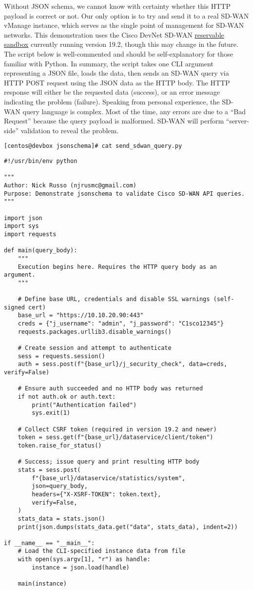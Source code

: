 Without JSON schema, we cannot know with certainty whether this HTTP payload
is correct or not. Our only option is to try and send it to a real SD-WAN
vManage instance, which serves as the single point of management for
SD-WAN networks. This demonstration uses the Cisco DevNet SD-WAN
\href{https://devnetsandbox.cisco.com/}{reservable sandbox}
currently running version 19.2, though this may
change in the future. The script below is well-commented and should
be self-explanatory for those familiar with Python. In summary,
the script takes one CLI argument representing a JSON file, loads
the data, then sends an SD-WAN query via HTTP POST request using
the JSON data as the HTTP body. The HTTP response will either be
the requested data (success), or an error message indicating the
problem (failure). Speaking from personal experience, the SD-WAN
query language is complex. Most of the time, any errors are due to
a ``Bad Request'' because the query payload is malformed. SD-WAN
will perform ``server-side'' validation to reveal the problem.

\begin{verbatim}
[centos@devbox jsonschema]# cat send_sdwan_query.py
\end{verbatim}

\begin{verbatim}
#!/usr/bin/env python

"""
Author: Nick Russo (njrusmc@gmail.com)
Purpose: Demonstrate jsonschema to validate Cisco SD-WAN API queries.
"""

import json
import sys
import requests

def main(query_body):
    """
    Execution begins here. Requires the HTTP query body as an argument.
    """

    # Define base URL, credentials and disable SSL warnings (self-signed cert)
    base_url = "https://10.10.20.90:443"
    creds = {"j_username": "admin", "j_password": "C1sco12345"}
    requests.packages.urllib3.disable_warnings()

    # Create session and attempt to authenticate
    sess = requests.session()
    auth = sess.post(f"{base_url}/j_security_check", data=creds, verify=False)

    # Ensure auth succeeded and no HTTP body was returned
    if not auth.ok or auth.text:
        print("Authentication failed")
        sys.exit(1)

    # Collect CSRF token (required in version 19.2 and newer)
    token = sess.get(f"{base_url}/dataservice/client/token")
    token.raise_for_status()

    # Success; issue query and print resulting HTTP body
    stats = sess.post(
        f"{base_url}/dataservice/statistics/system",
        json=query_body,
        headers={"X-XSRF-TOKEN": token.text},
        verify=False,
    )
    stats_data = stats.json()
    print(json.dumps(stats_data.get("data", stats_data), indent=2))

if __name__ == "__main__":
    # Load the CLI-specified instance data from file
    with open(sys.argv[1], "r") as handle:
        instance = json.load(handle)

    main(instance)
\end{verbatim}


